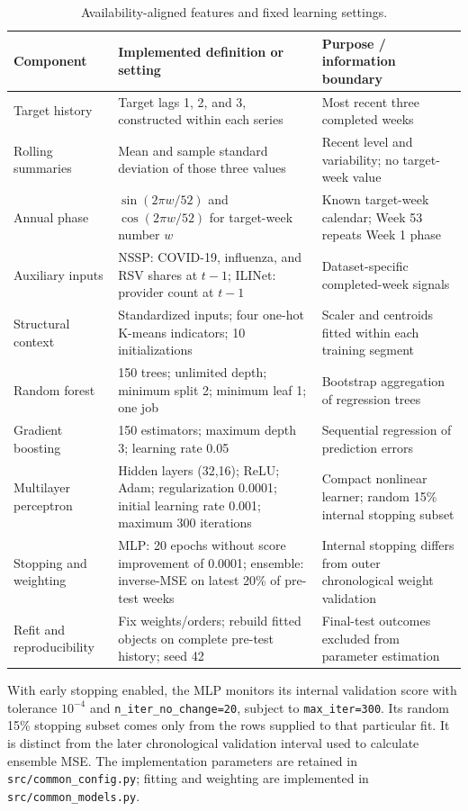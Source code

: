 \documentclass[10pt,a4paper]{article}
\begin{document}
\begin{table}[!ht]
\caption{Availability-aligned features and fixed learning settings.}
\label{tab:settings}\centering\footnotesize
\begin{tabularx}{\textwidth}{@{}p{}p{}Y@{}}
\toprule
Component & Implemented definition or setting & Purpose / information boundary\\
\midrule
Target history & Target lags 1, 2, and 3, constructed within each series & Most recent three completed weeks\\
Rolling summaries & Mean and sample standard deviation of those three values & Recent level and variability; no target-week value\\
Annual phase & $\sin(2\pi w/52)$ and $\cos(2\pi w/52)$ for target-week number $w$ & Known target-week calendar; Week 53 repeats Week 1 phase\\
Auxiliary inputs & NSSP: COVID-19, influenza, and RSV shares at $t-1$; ILINet: provider count at $t-1$ & Dataset-specific completed-week signals\\
Structural context & Standardized inputs; four one-hot K-means indicators; 10 initializations & Scaler and centroids fitted within each training segment\\
Random forest & 150 trees; unlimited depth; minimum split 2; minimum leaf 1; one job & Bootstrap aggregation of regression trees\\
Gradient boosting & 150 estimators; maximum depth 3; learning rate 0.05 & Sequential regression of prediction errors\\
Multilayer perceptron & Hidden layers (32,16); ReLU; Adam; regularization 0.0001; initial learning rate 0.001; maximum 300 iterations & Compact nonlinear learner; random 15\% internal stopping subset\\
Stopping and weighting & MLP: 20 epochs without score improvement of 0.0001; ensemble: inverse-MSE on latest 20\% of pre-test weeks & Internal stopping differs from outer chronological weight validation\\
Refit and reproducibility & Fix weights/orders; rebuild fitted objects on complete pre-test history; seed 42 & Final-test outcomes excluded from parameter estimation\\
\bottomrule
\end{tabularx}
\end{table}

With early stopping enabled, the MLP monitors its internal validation score with tolerance $10^{-4}$ and \nolinkurl{n_iter_no_change=20}, subject to \nolinkurl{max_iter=300}. Its random 15\% stopping subset comes only from the rows supplied to that particular fit. It is distinct from the later chronological validation interval used to calculate ensemble MSE. The implementation parameters are retained in \nolinkurl{src/common_config.py}; fitting and weighting are implemented in \nolinkurl{src/common_models.py}.
\end{document}
